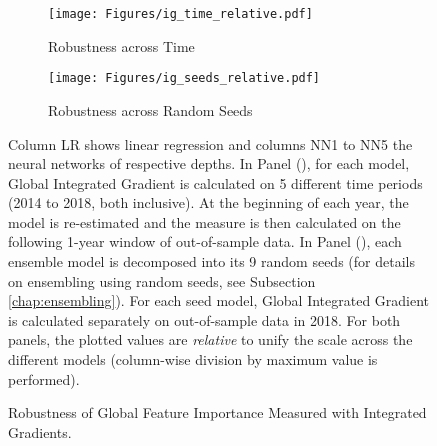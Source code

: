 		
		\begin{figure}	
			\centering		
			\begin{subfigure}[t]{\textwidth}
				\texttt{[image: Figures/ig\_time\_relative.pdf]}
				\caption{Robustness across Time}
				\label{fig:ig_time_relative}
			\end{subfigure}
			
			\begin{subfigure}[t]{\textwidth}
				\centering
				\texttt{[image: Figures/ig\_seeds\_relative.pdf]}
				\caption{Robustness across Random Seeds}
				\label{fig:ig_seeds_relative}
			\end{subfigure}
			\caption{Robustness of Global Feature Importance Measured with Integrated Gradients.}
			\medskip
			\small
			Column LR shows linear regression and columns NN1 to NN5 the neural networks of respective depths. In Panel (), for each model, Global Integrated Gradient is calculated on 5 different time periods (2014 to 2018, both inclusive). At the beginning of each year, the model is re-estimated and the measure is then calculated on the following 1-year window of out-of-sample data. In Panel (), each ensemble model is decomposed into its 9 random seeds (for details on ensembling using random seeds, see Subsection \ref{chap:ensembling}). For each seed model, Global Integrated Gradient is calculated separately on out-of-sample data in 2018. For both panels, the plotted values are \textit{relative} to unify the scale across the different models (column-wise division by maximum value is performed).
			\label{fig:ig_robustness}
		\end{figure}
	
